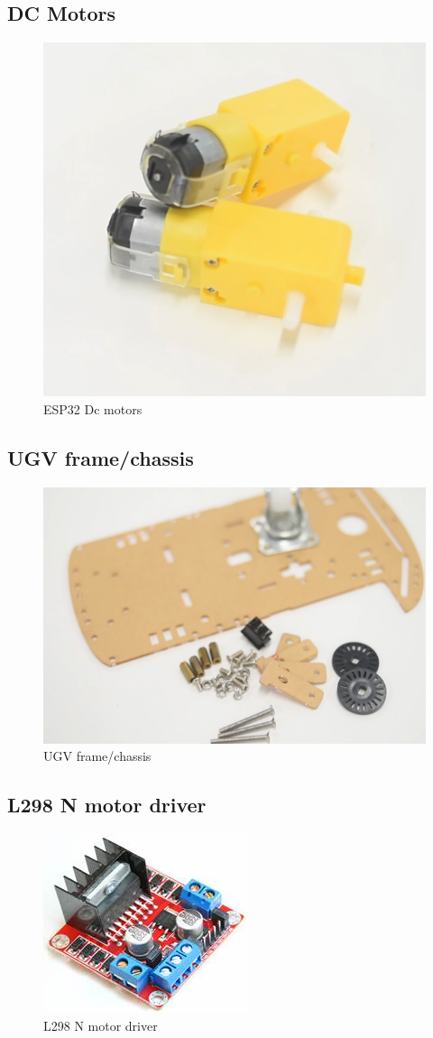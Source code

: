 \subsection{DC Motors}
\begin{figure}[H]
\centering
\includegraphics[width=0.5\columnwidth]{figs/motor.png}
\caption{ESP32 Dc motors}
\end{figure}

\subsection{UGV frame/chassis}
\begin{figure}[H]
\centering
\includegraphics[width=0.5\columnwidth]{figs/base.png}
\caption{UGV frame/chassis}
\end{figure}

\subsection{L298 N motor driver}
\begin{figure}[H]
\centering
\includegraphics[width=0.5\columnwidth]{figs/driver.jpg}
\caption{L298 N motor driver}
\end{figure}
